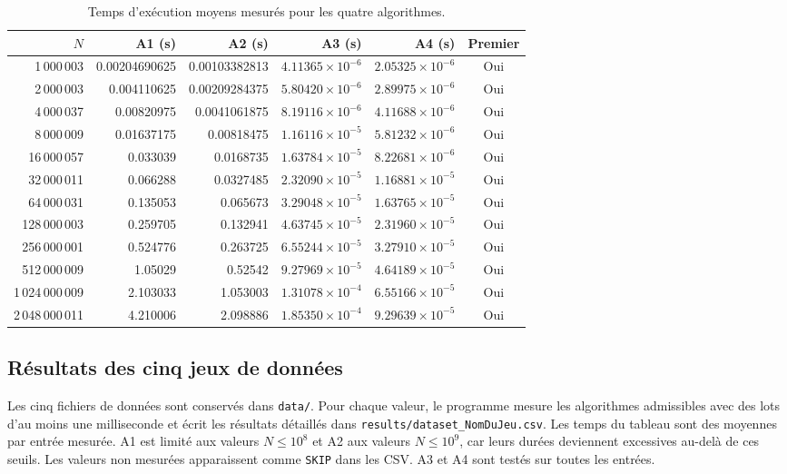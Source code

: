 \documentclass[11pt,a4paper]{article}
\begin{document}
\begin{table}[H]
\centering
\small
\begin{tabular}{r r r r r c}
\toprule
$N$ & A1 (s) & A2 (s) & A3 (s) & A4 (s) & Premier \\
\midrule
1\,000\,003 & 0.00204690625 & 0.00103382813 & $4.11365\times10^{-6}$ & $2.05325\times10^{-6}$ & Oui \\
2\,000\,003 & 0.004110625 & 0.00209284375 & $5.80420\times10^{-6}$ & $2.89975\times10^{-6}$ & Oui \\
4\,000\,037 & 0.00820975 & 0.0041061875 & $8.19116\times10^{-6}$ & $4.11688\times10^{-6}$ & Oui \\
8\,000\,009 & 0.01637175 & 0.00818475 & $1.16116\times10^{-5}$ & $5.81232\times10^{-6}$ & Oui \\
16\,000\,057 & 0.033039 & 0.0168735 & $1.63784\times10^{-5}$ & $8.22681\times10^{-6}$ & Oui \\
32\,000\,011 & 0.066288 & 0.0327485 & $2.32090\times10^{-5}$ & $1.16881\times10^{-5}$ & Oui \\
64\,000\,031 & 0.135053 & 0.065673 & $3.29048\times10^{-5}$ & $1.63765\times10^{-5}$ & Oui \\
128\,000\,003 & 0.259705 & 0.132941 & $4.63745\times10^{-5}$ & $2.31960\times10^{-5}$ & Oui \\
256\,000\,001 & 0.524776 & 0.263725 & $6.55244\times10^{-5}$ & $3.27910\times10^{-5}$ & Oui \\
512\,000\,009 & 1.05029 & 0.52542 & $9.27969\times10^{-5}$ & $4.64189\times10^{-5}$ & Oui \\
1\,024\,000\,009 & 2.103033 & 1.053003 & $1.31078\times10^{-4}$ & $6.55166\times10^{-5}$ & Oui \\
2\,048\,000\,011 & 4.210006 & 2.098886 & $1.85350\times10^{-4}$ & $9.29639\times10^{-5}$ & Oui \\
\bottomrule
\end{tabular}
\caption{Temps d'exécution moyens mesurés pour les quatre algorithmes.}
\label{tab:temps}
\end{table}

\subsection{Résultats des cinq jeux de données}

Les cinq fichiers de données sont conservés dans \texttt{data/}. Pour chaque valeur, le programme mesure les algorithmes admissibles avec des lots d'au moins une milliseconde et écrit les résultats détaillés dans \texttt{results/dataset\_NomDuJeu.csv}. Les temps du tableau sont des moyennes par entrée mesurée. A1 est limité aux valeurs $N\leq 10^8$ et A2 aux valeurs $N\leq 10^9$, car leurs durées deviennent excessives au-delà de ces seuils. Les valeurs non mesurées apparaissent comme \texttt{SKIP} dans les CSV. A3 et A4 sont testés sur toutes les entrées.
\end{document}
